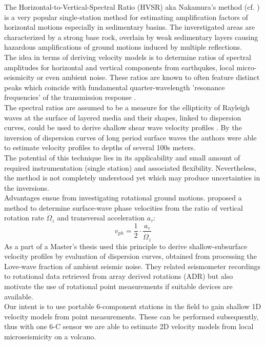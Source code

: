 \documentclass[12pt, a4paper]{article}
\begin{document}
The Horizontal-to-Vertical-Spectral Ratio (HVSR) aka Nakamura's method (cf. \citet{Nakamura1989}) is a very popular single-station method for estimating amplification factors of horizontal motions especially in sedimentary basins. The inverstigated areas are characterized by a strong base rock, overlain by weak sedimentary layers causing hazardous amplifications of ground motions induced by multiple reflections.\\
The idea in terms of deriving velocity models is to determine ratios of spectral amplitudes for horizontal and vertical components from earthqukes, local micro-seismicity or even ambient noise. These ratios are known to often feature distinct peaks which coincide with fundamental quarter-wavelength 'resonance frequencies' of the transmission response \citep{Mooney1966}.\\
The spectral ratios are assumed to be a measure for the ellipticity of Rayleigh waves at the surface of layered media and their shapes, linked to dispersion curves, could be used to derive shallow shear wave velocity profiles \citep{Scherbaum2003,Kohler2004}. By the inversion of dispersion curves of long period surface waves the authors were able to estimate velocity profiles to depths of several 100s meters.\\
The potential of this technique lies in its applicability and small amount of required  instrumentation (single station) and associated flexibility.
Nevertheless, the method is not completely understood yet which may produce uncertainties in the inversions.\\

Advantages ensue from investigating rotational ground motions. \citet{Igel2005} proposed a method to determine surface-wave phase velocities from the ratio of vertical rotation rate $\dot{\Omega}_z$ and transversal acceleration $a_\tau$:
\begin{equation}
	v_{ph} = \frac{1}{2} \cdot \frac{a_\tau}{\dot{\Omega}_z}
\end{equation}
As a part of a Master's thesis \citet{Wietek2013} used this principle to derive shallow-subsurface velocity profiles by evaluation of dispersion curves, obtained from processing the Love-wave fraction of ambient seismic noise. They related seismometer recordings to rotational data retrieved from array derived rotations (ADR) but also motivate the use of rotational point measurements if suitable devices are available.\\
Our intent is to use portable 6-component stations in the field to gain shallow 1D velocity models from point measurements. These can be performed subsequently, thus with one 6-C sensor we are able to estimate 2D velocity models from local microseismicity on a volcano.\\
\end{document}
